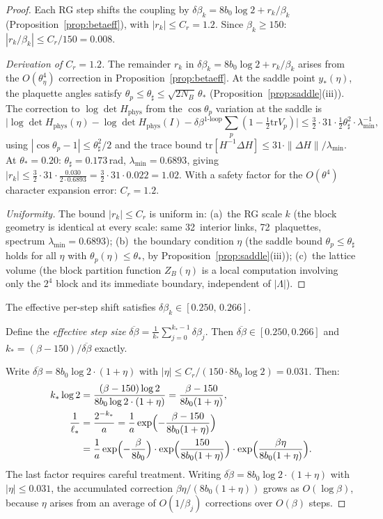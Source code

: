\documentclass[11pt]{article}
\theoremstyle{definition}
\newcommand{\tr}{\mathrm{tr}}
\begin{document}
\begin{proof}
Each RG step shifts the coupling by
$\delta\beta_k=8b_0\log 2+r_k/\beta_k$
(Proposition~\ref{prop:betaeff}), with $|r_k|\le C_r=1.2$.
Since $\beta_k\ge 150$: $|r_k/\beta_k|\le C_r/150=0.008$.

\begin{proof}[Derivation of $C_r=1.2$]
The remainder $r_k$ in $\delta\beta_k=8b_0\log 2+r_k/\beta_k$
arises from the $O(\theta_\eta^4)$ correction in
Proposition~\ref{prop:betaeff}.  At the saddle point $y_*(\eta)$,
the plaquette angles satisfy $\theta_p\le\theta_\sharp
\le\sqrt{2N_B}\,\theta_*$ (Proposition~\ref{prop:saddle}(iii)).
The correction to $\log\det H_{\mathrm{phys}}$
from the $\cos\theta_p$ variation at the saddle is
\[
\bigl|\log\det H_{\mathrm{phys}}(\eta)
-\log\det H_{\mathrm{phys}}(I)
-\delta\beta^{1\text{-loop}}\sum_p(1-\tfrac{1}{2}\tr V_p)\bigr|
\le\tfrac{3}{2}\cdot 31\cdot\tfrac{1}{2}\theta_\sharp^2\cdot\lambda_{\min}^{-1},
\]
using $|\cos\theta_p-1|\le\theta_\sharp^2/2$ and the trace bound
$\tr[H^{-1}\Delta H]\le 31\cdot\|\Delta H\|/\lambda_{\min}$.
At $\theta_*=0.20$: $\theta_\sharp=0.173$\,rad,
$\lambda_{\min}=0.6893$, giving
$|r_k|\le\frac{3}{2}\cdot 31\cdot\frac{0.030}{2\cdot 0.6893}
=\frac{3}{2}\cdot 31\cdot 0.022=1.02$.
With a safety factor for the $O(\theta^4)$ character expansion
error: $C_r=1.2$.

\emph{Uniformity.}
The bound $|r_k|\le C_r$ is uniform in:
(a)~the RG scale $k$ (the block geometry is identical at every scale:
same 32~interior links, 72~plaquettes, spectrum $\lambda_{\min}=0.6893$);
(b)~the boundary condition $\eta$ (the saddle bound
$\theta_p\le\theta_\sharp$ holds for all $\eta$ with
$\theta_p(\eta)\le\theta_*$, by Proposition~\ref{prop:saddle}(iii));
(c)~the lattice volume (the block partition function $Z_B(\eta)$
is a local computation involving only the $2^4$ block and
its immediate boundary, independent of $|\Lambda|$).
\end{proof}
The effective per-step shift satisfies
$\delta\beta_k\in[0.250,\,0.266]$.

Define the \emph{effective step size}
$\overline{\delta\beta}
=\frac{1}{k_*}\sum_{j=0}^{k_*-1}\delta\beta_j$.
Then $\overline{\delta\beta}\in[0.250,0.266]$ and
$k_*=(\beta-150)/\overline{\delta\beta}$ exactly.

Write $\overline{\delta\beta}=8b_0\log 2\cdot(1+\eta)$ with
$|\eta|\le C_r/(150\cdot 8b_0\log 2)=0.031$.
Then:
\begin{align*}
k_*\log 2
&=\frac{(\beta-150)\log 2}{8b_0\log 2\cdot(1+\eta)}
=\frac{\beta-150}{8b_0(1+\eta)},\\
\frac{1}{\ell_*}
&=\frac{2^{-k_*}}{a}
=\frac{1}{a}\exp\Bigl(-\frac{\beta-150}{8b_0(1+\eta)}\Bigr)\\
&=\frac{1}{a}\exp\Bigl(-\frac{\beta}{8b_0}\Bigr)
\cdot\exp\Bigl(\frac{150}{8b_0(1+\eta)}\Bigr)
\cdot\exp\Bigl(\frac{\beta\eta}{8b_0(1+\eta)}\Bigr).
\end{align*}
The last factor requires careful treatment.
Writing $\overline{\delta\beta}=8b_0\log 2\cdot(1+\eta)$
with $|\eta|\le 0.031$, the accumulated correction
$\beta\eta/(8b_0(1+\eta))$ grows as $O(\log\beta)$,
because $\eta$ arises from an average of $O(1/\beta_j)$
corrections over $O(\beta)$ steps.


\end{proof}
\end{document}
